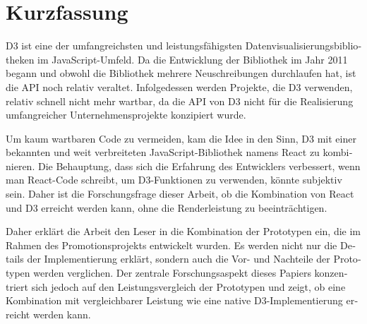 \chapter{Kurzfassung}

\begin{german}
D3 ist eine der umfangreichsten und leistungsfähigsten Datenvisualisierungsbibliotheken im JavaScript-Umfeld. Da die Entwicklung der Bibliothek im Jahr 2011 begann und obwohl die Bibliothek mehrere Neuschreibungen durchlaufen hat, ist die API noch relativ veraltet. Infolgedessen werden Projekte, die D3 verwenden, relativ schnell nicht mehr wartbar, da die API von D3 nicht für die Realisierung umfangreicher Unternehmensprojekte konzipiert wurde.

Um kaum wartbaren Code zu vermeiden, kam die Idee in den Sinn, D3 mit einer bekannten und weit verbreiteten JavaScript-Bibliothek namens React zu kombinieren. Die Behauptung, dass sich die Erfahrung des Entwicklers verbessert, wenn man React-Code schreibt, um D3-Funktionen zu verwenden, könnte subjektiv sein. Daher ist die Forschungsfrage dieser Arbeit, ob die Kombination von React und D3 erreicht werden kann, ohne die Renderleistung zu beeinträchtigen.

Daher erklärt die Arbeit den Leser in die Kombination der Prototypen ein, die im Rahmen des Promotionsprojekts entwickelt wurden. Es werden nicht nur die Details der Implementierung erklärt, sondern auch die Vor- und Nachteile der Prototypen werden verglichen. Der zentrale Forschungsaspekt dieses Papiers konzentriert sich jedoch auf den Leistungsvergleich der Prototypen und zeigt, ob eine Kombination mit vergleichbarer Leistung wie eine native D3-Implementierung erreicht werden kann.
\end{german}
